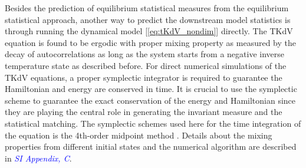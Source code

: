 \documentclass[9pt,twocolumn,twoside,lineno]{pnas-new}
\begin{document}
Besides the prediction of equilibrium statistical measures from the
equilibrium statistical approach, another way to predict the downstream
model statistics is through running the dynamical model [\ref{eq:tKdV_nondim}]
directly. The TKdV equation is found to be ergodic with proper mixing
property as measured by the decay of autocorrelations as long as the
system starts from a negative inverse temperature state as described
before. For direct numerical simulations of the TKdV equations, a
proper symplectic integrator is required to guarantee the Hamiltonian
and energy are conserved in time. It is crucial to use the symplectic
scheme to guarantee the exact conservation of the energy and Hamiltonian
since they are playing the central role in generating the invariant
measure and the statistical matching. The symplectic schemes used
here for the time integration of the equation is the 4th-order midpoint
method \cite{mclachlan1993symplectic}. Details about the mixing properties
from different initial states and the numerical algorithm are described
in \textcolor{blue}{\emph{SI Appendix, C}}.
\end{document}
